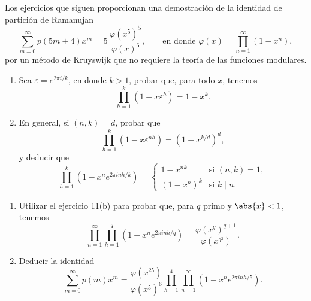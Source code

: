     Los ejercicios que siguen proporcionan una demostración de la identidad de partición de
    Ramanujan
    \begin{equation*}
        \sum_{m=0}^{\infty}p(5m+4)x^m=5\,\frac{\varphi(x^5)^5}{\varphi(x)^6},\qquad\text{en donde }\varphi(x)=\prod_{n=1}^{\infty}(1-x^n),
    \end{equation*}
    por un método de Kruyswijk que no requiere la teoría de las funciones modulares.

    \begin{ejercicio}
        \begin{enumerate}
            \item[(a)] Sea $\varepsilon=e^{2\pi i/k}$, en donde $k>1$, probar que, para todo
            $x$, tenemos
            \begin{equation*}
                \prod_{h=1}^{k}(1-x\varepsilon^h)=1-x^k.
            \end{equation*}
            \item[(b)] En general, si $(n,k)=d$, probar que
            \begin{equation*}
                \prod_{h=1}^{k}(1-x\varepsilon^{nh})=(1-x^{k/d})^d,
            \end{equation*}
            y deducir que
            \begin{equation*}
                \prod_{h=1}^{k}(1-x^ne^{2\pi inh/k})=
                \begin{cases}
                    1-x^{nk}&\text{si }(n,k)=1,\\
                    (1-x^n)^k&\text{si }k\mid n.
                \end{cases}
            \end{equation*}
        \end{enumerate}
    \end{ejercicio}

    \begin{ejercicio}
        \begin{enumerate}
            \item[(a)] Utilizar el ejercicio 11(b) para probar que, para $q$ primo y
            $\abs{x}<1$, tenemos
            \begin{equation*}
                \prod_{n=1}^{\infty}\prod_{h=1}^{q}(1-x^ne^{2\pi inh/q})=\frac{\varphi(x^q)^{q+1}}{\varphi(x^{q^2})}.
            \end{equation*}
            \item[(b)] Deducir la identidad
            \begin{equation*}
                \sum_{m=0}^{\infty}p(m)x^m=\frac{\varphi(x^{25})}{\varphi(x^5)^6}\prod_{h=1}^{4}\prod_{n=1}^{\infty}(1-x^ne^{2\pi inh/5}).
            \end{equation*}
        \end{enumerate}
    \end{ejercicio}

